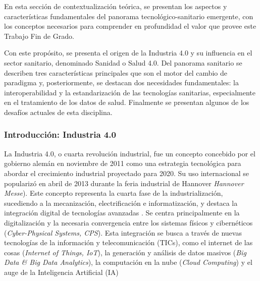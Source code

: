 En esta sección de contextualización teórica, se presentan los aspectos y características fundamentales del panorama tecnológico-sanitario emergente, con los conceptos necesarios para comprender en profundidad el valor que provee este Trabajo Fin de Grado.
 

Con este propósito, se presenta el origen de la Industria 4.0 y su influencia en el sector sanitario, denominado Sanidad o Salud 4.0. 
Del panorama sanitario se describen tres características principales que son el motor del cambio de paradigma y, posteriormente, se destacan dos necesidades fundamentales: la interoperabilidad y la estandarización de las tecnologías sanitarias, especialmente en el tratamiento de los datos de salud. Finalmente se presentan algunos de los desafíos actuales de esta disciplina.


\subsubsection{Introducción: Industria 4.0}

La Industria 4.0, o cuarta revolución industrial, fue un concepto concebido por el gobierno alemán en noviembre de 2011 como una estrategia tecnológica para abordar el crecimiento industrial proyectado para 2020. Su uso internacional se popularizó en abril de 2013 durante la feria industrial de Hannover \textit{Hannover Messe}). Este concepto representa la cuarta fase de la industrialización, sucediendo a la mecanización, electrificación e informatización, y destaca la integración digital de tecnologías avanzadas \cite{lasi2014industry}.
Se centra principalmente en la digitalización y la necesaria convergencia entre los sistemas físicos y cibernéticos (\textit{Cyber-Physical Systems, CPS}). Esta integración se busca a través de nuevas tecnologías de la información y telecomunicación (TICs), como el internet de las cosas (\textit{Internet of Things, IoT}), la generación y análisis de datos masivos (\textit{Big Data \& Big Data Analytics}), la computación en la nube (\textit{Cloud Computing}) y el auge de la Inteligencia Artificial (IA) \cite{lasi2014industry}\cite{chen2020times}\cite{tortorella2020healthcare}

